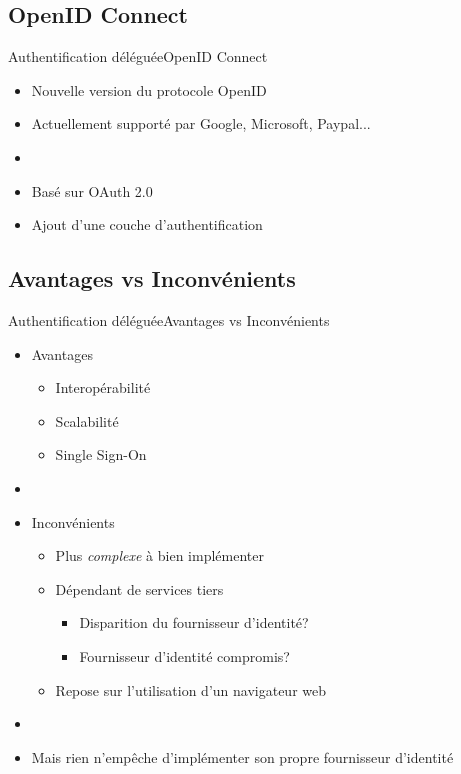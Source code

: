 \documentclass{beamer}
\begin{document}
\subsection{OpenID Connect}

\begin{frame}{Authentification déléguée}{OpenID Connect}
  \begin{center}
    \begin{itemize}
    \item Nouvelle version du protocole OpenID
    \item Actuellement supporté par Google, Microsoft, Paypal...
    \item[~]
    \item Basé sur OAuth 2.0
    \item Ajout d'une couche d'authentification
    \end{itemize}
  \end{center}
\end{frame}

\subsection{Avantages vs Inconvénients}

\begin{frame}{Authentification déléguée}{Avantages vs Inconvénients}
  \begin{center}
    \begin{itemize}
      \item Avantages
      \begin{itemize}
        \item Interopérabilité
        \item Scalabilité
        \item Single Sign-On
      \end{itemize}
      \pause
      \item[~]
      \item Inconvénients
      \begin{itemize}
        \item Plus \emph{complexe} à bien implémenter
        \item Dépendant de services tiers
        \begin{itemize}
          \item Disparition du fournisseur d'identité?
          \item Fournisseur d'identité compromis?
        \end{itemize}
        \item Repose sur l'utilisation d'un navigateur web
      \end{itemize}
      \pause
      \item[~]
      \item Mais rien n'empêche d'implémenter son propre fournisseur d'identité
    \end{itemize}
  \end{center}
\end{frame}
\end{document}
